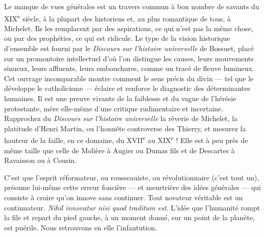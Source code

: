 \documentclass[french,twoside]{book} %
\begin{document}
Le manque de vues générales est un travers commun à bon nombre de savants du XIX\textsuperscript{e} siècle, à la plupart des historiens et, au plus romantique de tous, à Michelet. Ils les remplacent par des aspirations, ce qui n’est pas la même chose, ou par des prophéties, ce qui est ridicule. Le type de la vision historique d’ensemble est fourni par le {\itshape Discours sur l’histoire universelle} de Bossuet, placé sur un promontoire intellectuel d’où l’on distingue les causes, leurs mouvements sinueux, leurs affluents, leurs embouchures, comme un tracé de fleuve lumineux. Cet ouvrage incomparable montre comment le sens précis du divin — tel que le développe le catholicisme — éclaire et renforce le diagnostic des déterminantes humaines. Il est une preuve vivante de la faiblesse et du vague de l’hérésie protestante, mère elle-même d’une critique rudimentaire et incertaine. Rapprochez du {\itshape Discours sur l’histoire universelle} la rêverie de Michelet, la platitude d’Henri Martin, ou l’honnête controverse des Thierry, et mesurez la hauteur de la faille, en ce domaine, du XVII\textsuperscript{e} au XIX\textsuperscript{e} ! Elle est à peu près de même taille que celle de Molière à Augier ou Dumas fils et de Descartes à Ravaisson ou à Cousin.\par
C’est que l’esprit réformateur, ou rousseauiste, ou révolutionnaire (c’est tout un), présume lui-même cette erreur foncière — et meurtrière des idées générales — qui consiste à croire qu’on innove sans continuer. Tout novateur véritable est un continuateur. {\itshape Nihil innovatur nisi quod traditum est}. L’idée que l’humanité rompt la file et repart du pied gauche, à un moment donné, sur un point de la planète, est puérile. Nous retrouvons en elle l’infantution.\par
\end{document}
